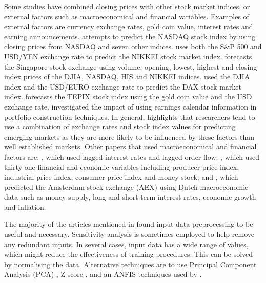 \documentclass{UoYCSproject}
\begin{document}
Some studies have combined closing prices with other stock market indices, or external factors such as macroeconomical and financial variables. Examples of external factors are currency exchange rates, gold coin value, interest rates and earning announcements. \cite{ajith2003hybrid} attempts to predict the NASDAQ stock index by using closing prices from NASDAQ and seven other indices. \cite{huang2005forecasting} uses both the S\&P 500 and USD/YEN exchange rate to predict the NIKKEI stock market index. \cite{phua2001neural} forecasts the Singapore stock exchange using volume, opening, lowest, highest and closing index prices of the DJIA, NASDAQ, HIS and NIKKEI indices. \cite{siekmann1999information} used the DJIA index and the USD/EURO exchange rate to predict the DAX stock market index. \cite{tabrizi2000stock} forecasts the TEPIX stock index using the gold coin value and the USD exchange rate. \cite{levodeanschi2016} investigated the impact of using earnings calendar information in portfolio construction techniques. In general, \cite{atsalakis2009surveying} highlights that researchers tend to use a combination of exchange rates and stock index values for predicting emerging markets as they are more likely to be influenced by these factors than well established markets. Other papers that used macroeconomical and financial factors are: \cite{gradojevic2002neuro}, which used lagged interest rates and lagged order flow; \cite{thawornwong2004adaptive}, which used thirty one financial and economic variables including producer price index, industrial price index, consumer price index and money stock; and \cite{setnes1999fuzzy}, which predicted the Amsterdam stock exchange (AEX) using Dutch macroeconomic data such as money supply, long and short term interest rates, economic growth and inflation.

The majority of the articles mentioned in \cite{atsalakis2009surveying} found input data preprocessing to be useful and necessary. Sensitivity analysis is sometimes employed to help remove any redundant inputs. In several cases, input data has a wide range of values, which might reduce the effectiveness of training procedures. This can be solved by normalising the data. Alternative techniques are to use Principal Component Analysis (PCA) \cite{ajith2003hybrid}, Z-score \cite{leigh2002analysis}, and an ANFIS techniques used by \cite{atsalakis2006neuro}. 
\end{document}
